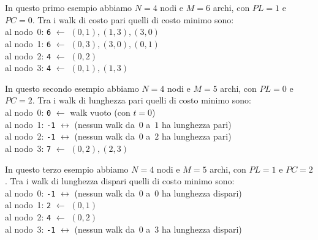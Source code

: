 \vspace{0.5cm}

In questo primo esempio abbiamo $N=4$ nodi e $M=6$ archi, con $PL=1$ e $PC=0$. Tra i walk di costo pari quelli di costo minimo sono:\\
\indent al nodo~0: {\tt 6}  $\leftarrow$ $(0,1),(1,3),(3,0)$\\ 
\indent al nodo~1: {\tt 6}  $\leftarrow$ $(0,3),(3,0),(0,1)$\\ 
\indent al nodo~2: {\tt 4}  $\leftarrow$ $(0,2)$\\ 
\indent al nodo~3: {\tt 4}  $\leftarrow$ $(0,1),(1,3)$\\ 

\vspace{0.5cm}

In questo secondo esempio abbiamo $N=4$ nodi e $M=5$ archi, con $PL=0$ e $PC=2$. Tra i walk di lunghezza pari quelli di costo minimo sono:\\
\indent al nodo~0: {\tt 0}  $\leftarrow$ walk vuoto (con $t=0$)\\ 
\indent al nodo~1: {\tt -1}  $\leftrightarrow$ (nessun walk da~$0$ a~$1$ ha lunghezza pari)\\
\indent al nodo~2: {\tt -1}  $\leftrightarrow$ (nessun walk da~$0$ a~$2$ ha lunghezza pari)\\ 
\indent al nodo~3: {\tt 7}  $\leftarrow$ $(0,2),(2,3)$\\ 

\vspace{0.5cm}

In questo terzo esempio abbiamo $N=4$ nodi e $M=5$ archi, con $PL=1$ e $PC=2$. Tra i walk di lunghezza dispari quelli di costo minimo sono:\\
\indent al nodo~0: {\tt -1}  $\leftrightarrow$ (nessun walk da~$0$ a~$0$ ha lunghezza dispari)\\ 
\indent al nodo~1: {\tt 2} $\leftarrow$ $(0,1)$\\ 
\indent al nodo~2: {\tt 4}  $\leftarrow$ $(0,2)$\\ 
\indent al nodo~3: {\tt -1}  $\leftrightarrow$ (nessun walk da~$0$ a~$3$ ha lunghezza dispari)\\ 



